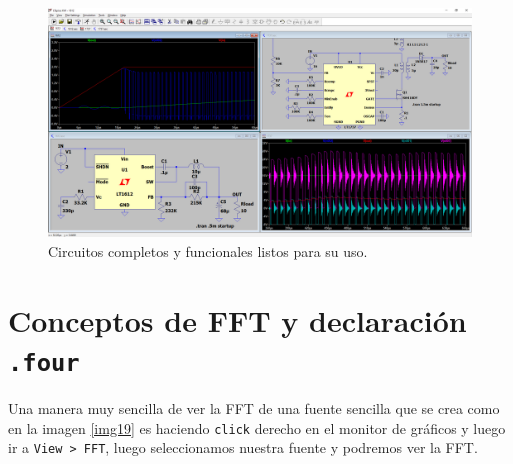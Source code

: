 \documentclass[a4paper]{article} %
\begin{document}
\begin{figure} %
	\centering %
	\includegraphics[scale=0.3]{IMAGENES/img17} %
	\caption{Circuitos completos y funcionales listos para su uso.} %
	\label{img18} %
\end{figure} %

\section{Conceptos de FFT y declaración \texttt{.four}}

Una manera muy sencilla de ver la FFT de una fuente sencilla que se crea como en la imagen \eqref{img19} es haciendo \texttt{click} derecho en el monitor de gráficos y luego ir a \texttt{View > FFT}, luego seleccionamos nuestra fuente y podremos ver la FFT. 
\end{document}
